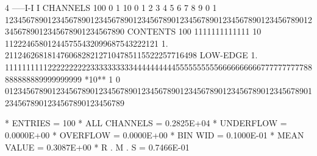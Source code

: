 \begin{Listing}
        4            -----I-I                                    I
 CHANNELS 100   0                                                                                                  1   
           10   0        1         2         3         4         5         6         7         8         9         0   
            1   1234567890123456789012345678901234567890123456789012345678901234567890123456789012345678901234567890   
 CONTENTS 100                          1111111111111                                                                
           10                 112224658012445755432099687543222121                                                  
            1.       211246268181476068282127104785115522257716498                                                  
 LOW-EDGE   1.            111111111122222222223333333333444444444455555555556666666666777777777788888888889999999999
 *10**  1   0   0123456789012345678901234567890123456789012345678901234567890123456789012345678901234567890123456789
 
 * ENTRIES =        100      * ALL CHANNELS = 0.2825E+04      * UNDERFLOW = 0.0000E+00      * OVERFLOW = 0.0000E+00
 * BIN WID = 0.1000E-01      * MEAN VALUE   = 0.3087E+00      * R . M . S = 0.7466E-01


\end{Listing}
